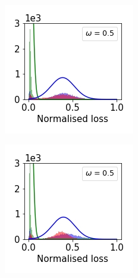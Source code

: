 \documentclass[11pt]{article}
\begin{document}
\begin{figure}[t]
\begin{subfigure}{.18\textwidth}
  \end{subfigure}
  \begin{subfigure}{.18\textwidth}
    \centering
    \includegraphics[width=\linewidth]{images/loss_dist/DM_0.6_0.50_cifar100.png} 
  \end{subfigure}
  \begin{subfigure}{.18\textwidth}
    \centering
    \includegraphics[width=\linewidth]{images/loss_dist/DM_0.6_0.50_imagenet32.png} 

\end{subfigure}
\end{figure}
\end{document}
